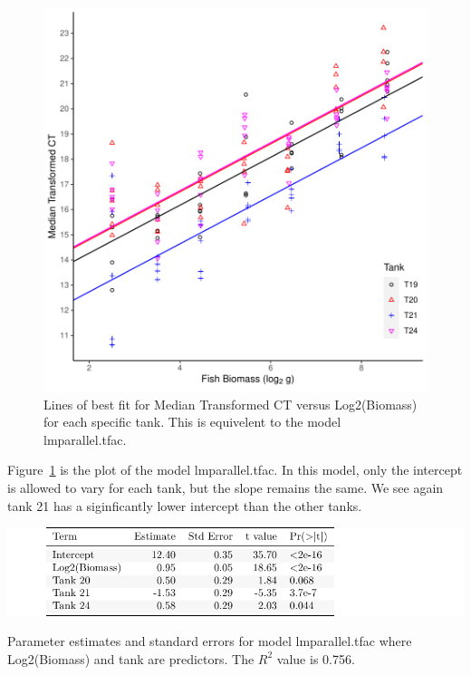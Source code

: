 \begin{figure}[H]
\includegraphics{Chapter3Images/parfits.pdf}
\caption{ Lines of best fit for Median Transformed CT versus Log2(Biomass) for each specific tank. This is equivelent to the model  lmparallel.tfac.}
\label{fig:medpar}
\end{figure}

Figure~\ref{fig:medpar} is the plot of the model  lmparallel.tfac. In this model, only the intercept is allowed to vary for each tank, but the slope remains the same. We see again tank 21 has a siginficantly lower intercept than the other tanks.


\vspace{5mm}

%

 \begin{table}[H]
\includegraphics{Chapter3Images/lmparallelkable.pdf}
\caption{Parameter estimates and standard errors for model  lmparallel.tfac where Log2(Biomass) and tank are predictors. The $R^{2}$ value is 0.756.}
\label{lab:lmparallel}
\end{table}



